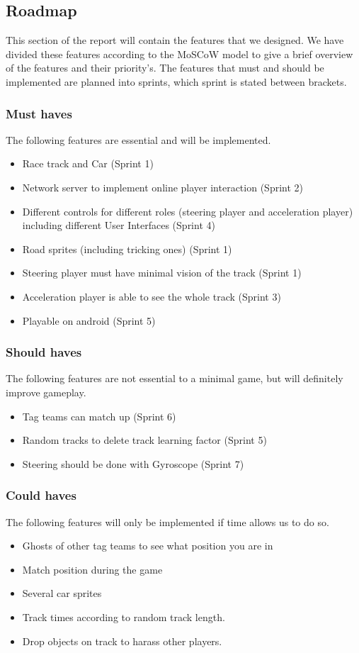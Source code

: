 \documentclass{article}
\begin{document}
\subsection{Roadmap}
This section of the report will contain the features that we designed. We have divided these features according to the \gls{MoSCoW} model to give a brief overview of the features and their priority's. The features that must and should be implemented are planned into sprints, which sprint is stated between brackets.
\subsubsection{Must haves}
The following features are essential and will be implemented.
\begin{itemize}
	\item Race track and Car (Sprint 1)
	\item Network server to implement online player interaction (Sprint 2)
	\item Different controls for different roles (\gls{steering player} and \gls{acceleration player}) including different User Interfaces (Sprint 4)
	\item Road sprites (including tricking ones) (Sprint 1)
    \item Steering player must have minimal vision of the track (Sprint 1)
    \item Acceleration player is able to see the whole track (Sprint 3)
    \item Playable on android (Sprint 5)
\end{itemize}
\subsubsection{Should haves}
The following features are not essential to a minimal game, but will definitely improve gameplay.
\begin{itemize}
    \item Tag teams can match up (Sprint 6)  
    \item Random tracks to delete track learning factor (Sprint 5)
    \item Steering should be done with \gls{Gyroscope} (Sprint 7)
\end{itemize}
\subsubsection{Could haves}
The following features will only be implemented if time allows us to do so.
\begin{itemize}
    \item \gls{Ghosts} of other tag teams to see what position you are in 
    \item Match position during the game
    \item Several car sprites
    \item Track times according to random track length.
    \item Drop objects on track to harass other players.
\end{itemize}
\end{document}
